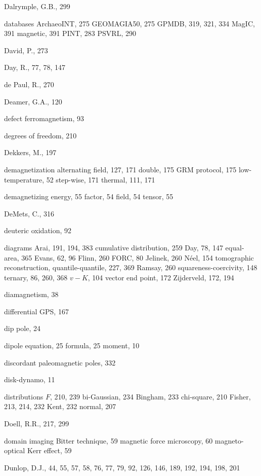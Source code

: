 \documentclass[,plain]{tauxe}
\begin{document}
\begin{theindex}
  \item Dalrymple, G.B., 299
  \item databases
    \subitem ArchaeoINT, 275
    \subitem GEOMAGIA50, 275
    \subitem GPMDB, 319, 321, 334
    \subitem MagIC, 391
    \subitem magnetic, 391
    \subitem PINT, 283
    \subitem PSVRL, 290
  \item David, P., 273
  \item Day, R., 77, 78, 147
  \item de Paul, R., 270
  \item Deamer, G.A., 120
  \item defect ferromagnetism, 93
  \item degrees of freedom, 210
  \item Dekkers, M., 197
  \item demagnetization
    \subitem alternating field, 127, 171
    \subitem double, 175
    \subitem GRM protocol, 175
    \subitem low-temperature, 52
    \subitem step-wise, 171
    \subitem thermal, 111, 171
  \item demagnetizing
    \subitem energy, 55
    \subitem factor, 54
    \subitem field, 54
    \subitem tensor, 55
  \item DeMets, C., 316
  \item deuteric oxidation, 92
  \item diagrams
    \subitem Arai, 191, 194, 383
    \subitem cumulative distribution, 259
    \subitem Day, 78, 147
    \subitem equal-area, 365
    \subitem Evans, 62, 96
    \subitem Flinn, 260
    \subitem FORC, 80
    \subitem Jelinek, 260
    \subitem N\'eel, 154
      \subsubitem tomographic reconstruction,
    \subitem quantile-quantile, 227, 369
    \subitem Ramsay, 260
    \subitem squareness-coercivity, 148
    \subitem ternary, 86, 260, 368
    \subitem $v-K$, 104
    \subitem vector end point, 172
    \subitem Zijderveld, 172, 194
  \item diamagnetism, 38
  \item differential GPS, 167
  \item dip pole, 24
  \item dipole
    \subitem equation, 25
    \subitem formula, 25
    \subitem moment, 10
  \item discordant paleomagnetic poles, 332
  \item disk-dynamo, 11
  \item distributions
    \subitem $F$, 210, 239
    \subitem bi-Gaussian, 234
    \subitem Bingham, 233
    \subitem chi-square, 210
    \subitem Fisher, 213, 214, 232
    \subitem Kent, 232
    \subitem normal, 207
  \item Doell, R.R., 217, 299
  \item domain imaging
    \subitem Bitter technique, 59
    \subitem magnetic force microscopy, 60
    \subitem magneto-optical Kerr effect, 59
  \item Dunlop, D.J., 44, 55, 57, 58, 76, 77, 79, 92, 126, 146, 189, 
		192, 194, 198, 201


\end{theindex}
\end{document}
